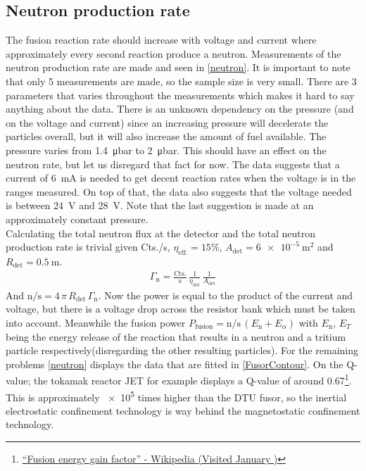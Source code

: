 \subsection{Neutron production rate}
The fusion reaction rate should increase with voltage and current where approximately every second reaction produce a neutron. Measurements of the neutron production rate are made and seen in \cref{neutron}. It is important to note that only 5 measurements are made, so the sample size is very small. There are 3 parameters that varies throughout the measurements which makes it hard to say anything about the data. There is an unknown dependency on the pressure (and on the voltage and current) since an increasing pressure will decelerate the particles overall, but it will also increase the amount of fuel available. The pressure varies from \SI{1.4}{\micro\bar} to \SI{2}{\micro\bar}. This should have an effect on the neutron rate, but let us disregard that fact for now. The data suggests that a current of \SI{6}{\milli\ampere} is needed to get decent reaction rates when the voltage is in the ranges measured. On top of that, the data also suggests that the voltage needed is between \SI{24}{\volt} and \SI{28}{\volt}. Note that the last suggestion is made at an approximately constant pressure.\\
Calculating the total neutron flux at the detector and the total neutron production rate is trivial given Cts./s,  \(\eta_{\mathrm{eff.}}=15\%\), \(A_{\mathrm{det}}=\SI{6e-5}{\meter\squared}\) and \(R_{\mathrm{det}}=\SI{0.5}{\meter}\).
\begin{align}
	\Gamma_{\mathrm{n}}=\frac{\mathrm{Cts.}}{\mathrm{s}}\,\frac{1}{\eta_{\mathrm{det}}}\,\frac{1}{A_{\mathrm{det}}}
\end{align}
And \(\mathrm{n}/\mathrm{s}=4\,\pi\, R_{\mathrm{det}}\,\Gamma_{\mathrm{n}}\). Now the power is equal to the product of the current and voltage, but there is a voltage drop across the resistor bank which must be taken into account. Meanwhile the fusion power \(P_{\mathrm{fusion}}=\mathrm{n}/\mathrm{s}\, (E_{\mathrm{n}}+E_{\alpha})\) with \(E_{\mathrm{n}},\,E_{T}\) being the energy release of the reaction that results in a neutron and a tritium particle respectively(disregarding the other resulting particles). For the remaining problems \cref{neutron} displays the data that are fitted in \cref{FusorContour}. On the Q-value; the tokamak reactor JET for example displays a Q-value of around 0.67\footnote{\href{https://en.wikipedia.org/wiki/Fusion_energy_gain_factor}{``Fusion energy gain factor'' - Wikipedia (Visited January )}}. This is approximately \SI{e5}{} times higher than the DTU fusor, so the inertial electrostatic confinement technology is way behind the magnetostatic confinement technology.
